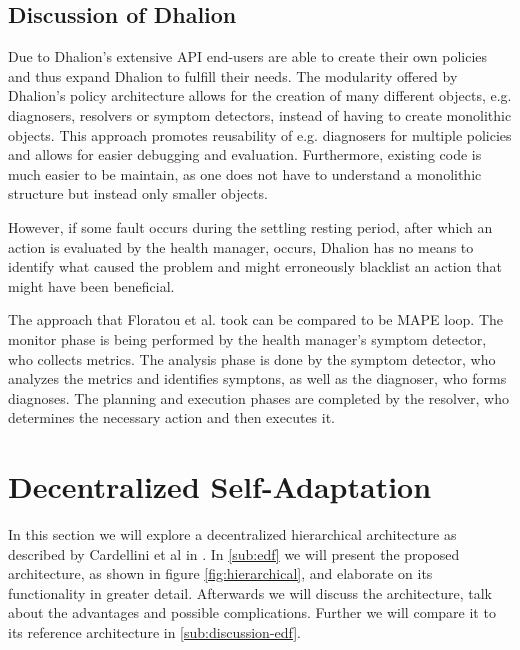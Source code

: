         \subsection{Discussion of Dhalion}
        \label{sub:dhalion-discussion}
        Due to Dhalion's extensive API end-users are able to create their own policies and thus expand Dhalion to fulfill their needs. 
        The modularity offered by Dhalion's policy architecture allows for the creation of many different objects, e.g. diagnosers, resolvers or symptom detectors, 
        instead of having to create monolithic objects.
        This approach promotes reusability of e.g. diagnosers for multiple policies and allows for easier debugging and evaluation.
        Furthermore, existing code is much easier to be maintain, as one does not have to understand a monolithic structure but instead only smaller objects.
        
        \quad However, if some fault occurs during the settling resting period, after which an action is evaluated by the health manager, occurs, Dhalion has no means to 
        identify what caused the problem and might erroneously blacklist an action that might have been beneficial.

        \quad The approach that Floratou et al. took can be compared to be MAPE loop. The monitor phase is being performed by the health manager's symptom detector, who collects metrics.
        The analysis phase is done by the symptom detector, who analyzes the metrics and identifies symptons, as well as the diagnoser, who forms diagnoses.
        The planning and execution phases are completed by the resolver, who determines the necessary action and then executes it.

    \section{Decentralized Self-Adaptation}
    \label{sec:hierarchical}
    In this section we will explore a decentralized hierarchical architecture as described by Cardellini et al in \cite{cardellini}.
    In \ref{sub:edf} we will present the proposed architecture, as shown in figure \ref{fig:hierarchical}, and elaborate on its functionality in greater detail.
    Afterwards we will discuss the architecture, talk about the advantages and possible complications. Further we will compare it to its reference architecture in \ref{sub:discussion-edf}.


